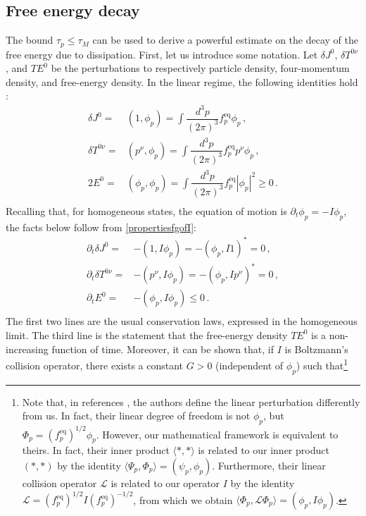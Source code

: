 \documentclass[a4paper, amsfonts, amssymb, amsmath, reprint, showkeys, nofootinbib, twoside, onecolumn,notitlepage]{revtex4-2}
\theoremstyle{definition}
\theoremstyle{theorem}
\theoremstyle{corollary}
\begin{document}
\subsection{Free energy decay}

The bound $\tau_p \leq \tau_M$ can be used to derive a powerful estimate on the decay of the free energy due to dissipation.
First, let us introduce some notation. Let $\delta J^0$, $\delta T^{0\nu}$, and $TE^0$ be the perturbations to respectively particle density, four-momentum density, and free-energy density. In the linear regime, the following identities hold \cite{GavassinoCausality2021,GavassinoGapless2024rck,RochaGavassinoFluctu:2024afv}:
\begin{equation}
\begin{split}
\delta J^0 ={}& (1,\phi_p) = \int \dfrac{d^3 p}{(2\pi)^3} f^{\text{eq}}_p \phi_p \, , \\
\delta T^{0\nu} ={}& (p^\nu,\phi_p) = \int \dfrac{d^3 p}{(2\pi)^3} f^{\text{eq}}_p p^\nu \phi_p \, , \\
2E^0 ={}&  (\phi_p,\phi_p) =  \int \dfrac{d^3 p}{(2\pi)^3} f^{\text{eq}}_p |\phi_p|^2 \geq 0 \, . \\
\end{split}
\end{equation}
Recalling that, for homogeneous states, the equation of motion is $\partial_t\phi_p=-I\phi_p$, the facts below follow from \eqref{propertiesfgofI}:
\begin{equation}\label{eetgrthy}
\begin{split}
\partial_t\delta J^0 ={}& -(1,I\phi_p)=-(\phi_p,I1)^*=0 \, , \\
\partial_t \delta T^{0\nu} ={}& -(p^\nu,I\phi_p) = -(\phi_p,Ip^\nu)^*=0\, , \\
\partial_t E^0 ={}&  -(\phi_p,I\phi_p) \leq 0 \, . \\
\end{split}
\end{equation}
The first two lines are the usual conservation laws, expressed in the homogeneous limit. The third line is the statement that the free-energy density $TE^0$ is a non-increasing function of time. Moreover, it can be shown \cite{Strain2010,Speck2011} that, if $I$ is Boltzmann's collision operator, there exists a constant $G>0$ (independent of $\phi_p$) such that\footnote{Note that, in references \cite{Strain2010,Speck2011}, the authors define the linear perturbation differently from us. In fact, their linear degree of freedom is not $\phi_p$, but $\Phi_p=(f^{\text{eq}}_p)^{1/2} \phi_p$. However, our mathematical framework is equivalent to theirs. In fact, their inner product $\langle *,*\rangle$ is related to our inner product $(*,*)$ by the identity $\langle \Psi_p,\Phi_p\rangle =(\psi_p,\phi_p)$. Furthermore, their linear collision operator $\mathcal{L}$ is related to our operator $I$ by the identity $\mathcal{L}=(f^{\text{eq}}_p)^{1/2} I (f^{\text{eq}}_p)^{-1/2}$, from which we obtain $\langle \Phi_p,\mathcal{L}\Phi_p\rangle=(\phi_p,I\phi_p)$.}
\end{document}
